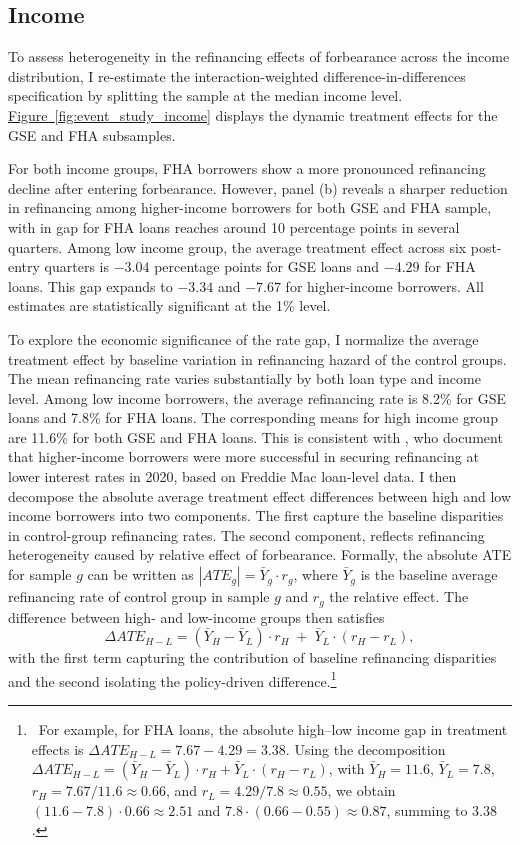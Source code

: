 \documentclass[11pt]{article}
\begin{document}
{\subsection{Income}
\label{sec:income_eventstudy}

To assess heterogeneity in the refinancing effects of forbearance across the income distribution, I re-estimate the interaction-weighted difference-in-differences specification by splitting the sample at the median income level. \hyperref[fig:event_study_income]{Figure~\ref*{fig:event_study_income}} displays the dynamic treatment effects for the GSE and FHA subsamples.

For both income groups, FHA borrowers show a more pronounced refinancing decline after entering forbearance. 
However, panel (b) reveals a sharper reduction in refinancing among higher-income borrowers for both GSE and FHA sample, with in gap for FHA loans reaches around 10 percentage points in several quarters. Among low income group, the average treatment effect across six post-entry quarters is $-3.04$ percentage points for GSE loans and $-4.29$ for FHA loans. This gap expands to $-3.34$ and $-7.67$ for higher-income borrowers. All estimates are statistically significant at the 1\% level.

To explore the economic significance of the rate gap, I normalize the average treatment effect by baseline variation in refinancing hazard of the control groups. The mean refinancing rate varies substantially by both loan type and income level. Among low income borrowers, the average refinancing rate is 8.2\% for GSE loans and 7.8\% for FHA loans. The corresponding means for high income group are 11.6\% for both GSE and FHA loans.  This is consistent with \citet{agarwal2024refinancing}, who document that higher-income borrowers were more successful in securing refinancing at lower interest rates in 2020, based on Freddie Mac loan-level data. I then decompose the absolute average treatment effect differences between high and low income borrowers into two components. The first capture the baseline disparities in control-group refinancing rates. The second component, reflects refinancing heterogeneity caused by relative effect of forbearance. Formally, the absolute ATE for sample $g$ can be written as $|ATE_g| = \bar{Y}_g \cdot r_g$, where $\bar{Y}_g$ is the baseline average refinancing rate of control group in sample $g$ and $r_g$ the relative effect. The difference between high- and low-income groups then satisfies  
\[
\Delta ATE_{H-L} = (\bar{Y}_{H} - \bar{Y}_{L}) \cdot r_{H} \;+\; \bar{Y}_{L} \cdot (r_{H} - r_{L}),
\]  
with the first term capturing the contribution of baseline refinancing disparities and the second isolating the policy-driven difference.\footnote{~For example, for FHA loans, the absolute high--low income gap in treatment effects is 
$\Delta ATE_{H-L} = 7.67 - 4.29 = 3.38$. Using the decomposition 
$\Delta ATE_{H-L} = (\bar{Y}_{H} - \bar{Y}_{L}) \cdot r_{H} + \bar{Y}_{L} \cdot (r_{H} - r_{L})$, 
with $\bar{Y}_{H} = 11.6$, $\bar{Y}_{L} = 7.8$, $r_H = 7.67/11.6 \approx 0.66$, and 
$r_L = 4.29/7.8 \approx 0.55$, we obtain 
$(11.6 - 7.8)\cdot 0.66 \approx 2.51$ and $7.8 \cdot (0.66 - 0.55) \approx 0.87$, 
summing to $3.38$.
}

}
\end{document}

